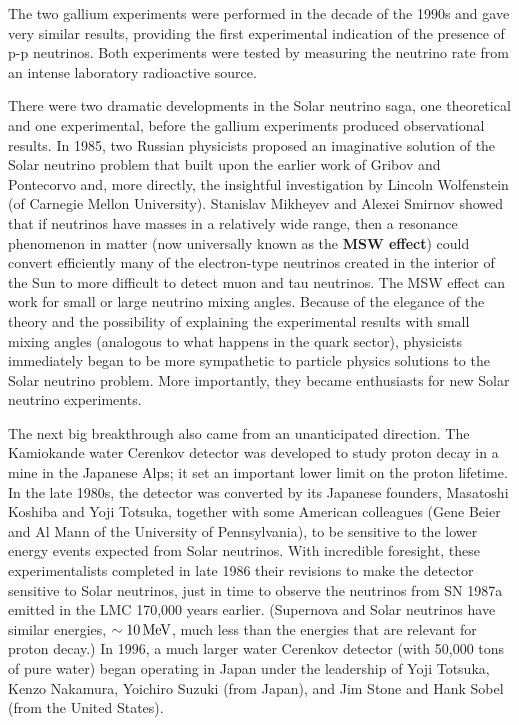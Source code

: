 \documentclass[a4paper,10pt]{article}
\begin{document}
{\noindent}The two gallium experiments were performed in the decade of the 1990s and gave very similar results, providing the first experimental indication of the presence of p-p neutrinos. Both experiments were tested by measuring the neutrino rate from an intense laboratory radioactive source.

{\noindent}There were two dramatic developments in the Solar neutrino saga, one theoretical and one experimental, before the gallium experiments produced observational results. In 1985, two Russian physicists proposed an imaginative solution of the Solar neutrino problem that built upon the earlier work of Gribov and Pontecorvo and, more directly, the insightful investigation by Lincoln Wolfenstein (of Carnegie Mellon University). Stanislav Mikheyev and Alexei Smirnov showed that if neutrinos have masses in a relatively wide range, then a resonance phenomenon in matter (now universally known as the \textbf{MSW effect}) could convert efficiently many of the electron-type neutrinos created in the interior of the Sun to more difficult to detect muon and tau neutrinos. The MSW effect can work for small or large neutrino mixing angles. Because of the elegance of the theory and the possibility of explaining the experimental results with small mixing angles (analogous to what happens in the quark sector), physicists immediately began to be more sympathetic to particle physics solutions to the Solar neutrino problem. More importantly, they became enthusiasts for new Solar neutrino experiments.

{\noindent}The next big breakthrough also came from an unanticipated direction. The Kamiokande water Cerenkov detector was developed to study proton decay in a mine in the Japanese Alps; it set an important lower limit on the proton lifetime. In the late 1980s, the detector was converted by its Japanese founders, Masatoshi Koshiba and Yoji Totsuka, together with some American colleagues (Gene Beier and Al Mann of the University of Pennsylvania), to be sensitive to the lower energy events expected from Solar neutrinos. With incredible foresight, these experimentalists completed in late 1986 their revisions to make the detector sensitive to Solar neutrinos, just in time to observe the neutrinos from SN 1987a emitted in the LMC 170,000 years earlier. (Supernova and Solar neutrinos have similar energies, $\sim10\,{\rm MeV}$, much less than the energies that are relevant for proton decay.) In 1996, a much larger water Cerenkov detector (with 50,000 tons of pure water) began operating in Japan under the leadership of Yoji Totsuka, Kenzo Nakamura, Yoichiro Suzuki (from Japan), and Jim Stone and Hank Sobel (from the United States).
\end{document}
